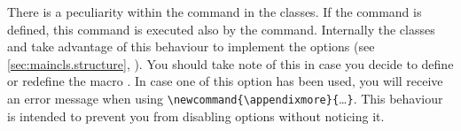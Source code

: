 %
%
%
%
%
%
%


\begin{Declaration}
\end{Declaration}%
%
There is a peculiarity within the  command in the
{\KOMAScript} classes. If the command  is defined, this
command is executed also by the  command. Internally the
{\KOMAScript} classes  and  take advantage of this behaviour to
implement the options  (see
\autoref{sec:maincls.structure},
). You
should take note of this in case you decide to define or redefine the macro
. In case one of this option has been used, you will
receive an error message when using
\verb|\newcommand{\appendixmore}{|\dots\verb|}|. This behaviour is intended to
prevent you from disabling options without noticing it.

